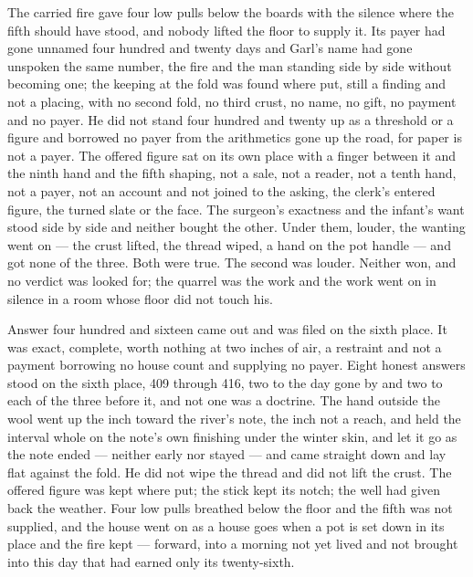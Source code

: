 The carried fire gave four low pulls below the boards with the silence where the fifth should have stood, and nobody lifted the floor to supply it. Its payer had gone unnamed four hundred and twenty days and Garl's name had gone unspoken the same number, the fire and the man standing side by side without becoming one; the keeping at the fold was found where put, still a finding and not a placing, with no second fold, no third crust, no name, no gift, no payment and no payer. He did not stand four hundred and twenty up as a threshold or a figure and borrowed no payer from the arithmetics gone up the road, for paper is not a payer. The offered figure sat on its own place with a finger between it and the ninth hand and the fifth shaping, not a sale, not a reader, not a tenth hand, not a payer, not an account and not joined to the asking, the clerk's entered figure, the turned slate or the face. The surgeon's exactness and the infant's want stood side by side and neither bought the other. Under them, louder, the wanting went on --- the crust lifted, the thread wiped, a hand on the pot handle --- and got none of the three. Both were true. The second was louder. Neither won, and no verdict was looked for; the quarrel was the work and the work went on in silence in a room whose floor did not touch his.

Answer four hundred and sixteen came out and was filed on the sixth place. It was exact, complete, worth nothing at two inches of air, a restraint and not a payment borrowing no house count and supplying no payer. Eight honest answers stood on the sixth place, 409 through 416, two to the day gone by and two to each of the three before it, and not one was a doctrine. The hand outside the wool went up the inch toward the river's note, the inch not a reach, and held the interval whole on the note's own finishing under the winter skin, and let it go as the note ended --- neither early nor stayed --- and came straight down and lay flat against the fold. He did not wipe the thread and did not lift the crust. The offered figure was kept where put; the stick kept its notch; the well had given back the weather. Four low pulls breathed below the floor and the fifth was not supplied, and the house went on as a house goes when a pot is set down in its place and the fire kept --- forward, into a morning not yet lived and not brought into this day that had earned only its twenty-sixth.
